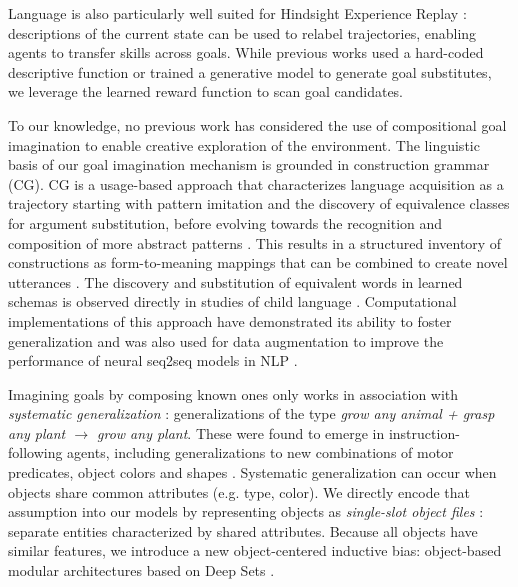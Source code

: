 Language is also particularly well suited for Hindsight Experience Replay \cite{andrychowicz2017hindsight}: descriptions of the current state can be used to relabel trajectories, enabling agents to transfer skills across goals. While previous works used a hard-coded descriptive function \cite{chan2019actrce, Jiang2019} or trained a generative model \cite{ther} to generate goal substitutes, we leverage the learned reward function to scan goal candidates.

To our knowledge, no previous work has considered the use of compositional goal imagination to enable creative exploration of the environment.
The linguistic basis of our goal imagination mechanism is grounded in construction grammar (CG). CG is a usage-based approach that characterizes language acquisition as a trajectory starting with pattern imitation and the discovery of equivalence classes for argument substitution, before evolving towards the recognition and composition of more abstract patterns \cite{tomasello2000item,goldberg2003constructions}. This results in a structured inventory of constructions as form-to-meaning mappings that can be combined to create novel utterances \cite{goldberg2003constructions}. The discovery and substitution of equivalent words in learned schemas is observed directly in studies of child language \cite{tomasello1993twenty, tomasello2000item}.
Computational implementations of this approach have demonstrated its ability to foster generalization \cite{hinaut2013real} and was also used for data augmentation to improve the performance of neural seq2seq models in NLP \cite{andreas2019goodenough}.
 

Imagining goals by composing known ones only works in association with \textit{systematic generalization} \cite{bahdanau2018systematic,hill2019emergent}: generalizations of the type \textit{grow any animal + grasp any plant $\to$ grow any plant}. These were found to emerge in instruction-following agents, including generalizations to new combinations of motor predicates, object colors and shapes \cite{Hermann2017,hill2019emergent, bahdanau2018learning}. Systematic generalization can occur when objects share common attributes (e.g. type, color). 
We directly encode that assumption into our models by representing objects as \textit{single-slot object files} \cite{green2017object}: separate entities characterized by shared attributes. Because all objects have similar features, we introduce a new object-centered inductive bias: object-based modular architectures based on Deep Sets \cite{deepset}.


